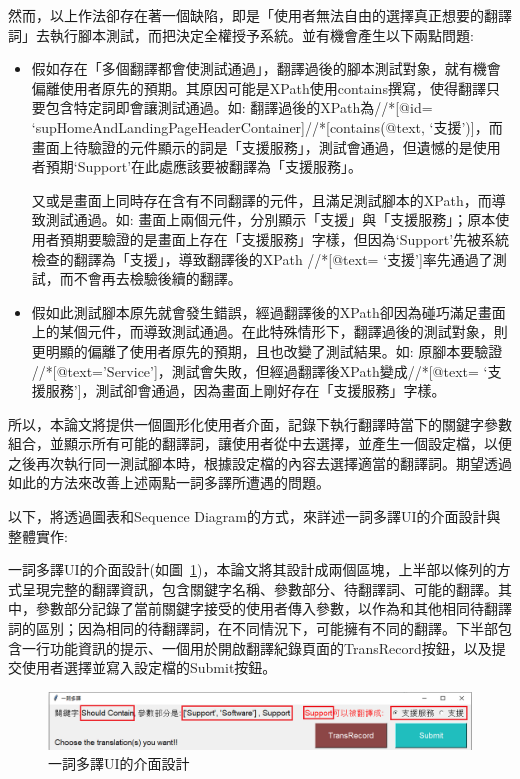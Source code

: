 然而，以上作法卻存在著一個缺陷，即是「使用者無法自由的選擇真正想要的翻譯詞」去執行腳本測試，而把決定全權授予系統。並有機會產生以下兩點問題:
\begin{itemize}
\item[1.]假如存在「多個翻譯都會使測試通過」，翻譯過後的腳本測試對象，就有機會偏離使用者原先的預期。其原因可能是XPath使用contains撰寫，使得翻譯只要包含特定詞即會讓測試通過。如: 翻譯過後的XPath為//*[@id= ‘supHomeAndLandingPageHeaderContainer]//*[contains(@text, ‘支援’)]，而畫面上待驗證的元件顯示的詞是「支援服務」，測試會通過，但遺憾的是使用者預期‘Support’在此處應該要被翻譯為「支援服務」。
 
\hspace{5mm} 又或是畫面上同時存在含有不同翻譯的元件，且滿足測試腳本的XPath，而導致測試通過。如: 畫面上兩個元件，分別顯示「支援」與「支援服務」；原本使用者預期要驗證的是畫面上存在「支援服務」字樣，但因為‘Support’先被系統檢查的翻譯為「支援」，導致翻譯後的XPath //*[@text= ‘支援’]率先通過了測試，而不會再去檢驗後續的翻譯。 
\item[2.]假如此測試腳本原先就會發生錯誤，經過翻譯後的XPath卻因為碰巧滿足畫面上的某個元件，而導致測試通過。在此特殊情形下，翻譯過後的測試對象，則更明顯的偏離了使用者原先的預期，且也改變了測試結果。如: 原腳本要驗證 //*[@text='Service']，測試會失敗，但經過翻譯後XPath變成//*[@text= ‘支援服務’]，測試卻會通過，因為畫面上剛好存在「支援服務」字樣。
\end{itemize}

所以，本論文將提供一個圖形化使用者介面，記錄下執行翻譯時當下的關鍵字參數組合，並顯示所有可能的翻譯詞，讓使用者從中去選擇，並產生一個設定檔，以便之後再次執行同一測試腳本時，根據設定檔的內容去選擇適當的翻譯詞。期望透過如此的方法來改善上述兩點一詞多譯所遭遇的問題。

以下，將透過圖表和Sequence Diagram的方式，來詳述一詞多譯UI的介面設計與整體實作:

一詞多譯UI的介面設計(如圖~\ref{一詞多譯UI的介面設計})，本論文將其設計成兩個區塊，上半部以條列的方式呈現完整的翻譯資訊，包含關鍵字名稱、參數部分、待翻譯詞、可能的翻譯。其中，參數部分記錄了當前關鍵字接受的使用者傳入參數，以作為和其他相同待翻譯詞的區別；因為相同的待翻譯詞，在不同情況下，可能擁有不同的翻譯。下半部包含一行功能資訊的提示、一個用於開啟翻譯紀錄頁面的TransRecord按鈕，以及提交使用者選擇並寫入設定檔的Submit按鈕。
\begin{figure}[H]
    \centering
    \includegraphics[width= 1.1\textwidth]{../論文截圖/3-4-1一詞多譯UI介面設計.png}
    \caption{一詞多譯UI的介面設計}
    \label{一詞多譯UI的介面設計}
\end{figure}

